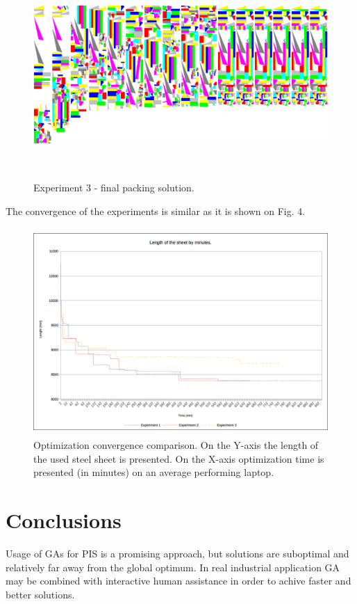 \documentclass{llncs}
\begin{document}
%
\begin{figure}
	\centering
	\includegraphics[width=12.62cm,height=7.88cm]{fig03.png}
	\caption{Experiment 3 - final packing solution.}
	\label{fig:Graph}
\end{figure}
\FloatBarrier

The convergence of the experiments is similar as it is shown on Fig. 4.

\begin{figure}
	\centering
	\includegraphics[width=12.62cm,height=7.88cm]{fig05.png}
	\caption{Optimization convergence comparison. On the Y-axis the length of the used steel sheet is presented. On the X-axis optimization time is presented (in minutes) on an average performing laptop.}
	\label{fig:Graph}
\end{figure}
\FloatBarrier

\section{Conclusions}
%
Usage of GAs for PIS is a promising approach, but solutions are suboptimal and relatively far away from the global optimum. In real industrial application GA may be combined with interactive human assistance in order to achive faster and better solutions. 
%
\end{document}
